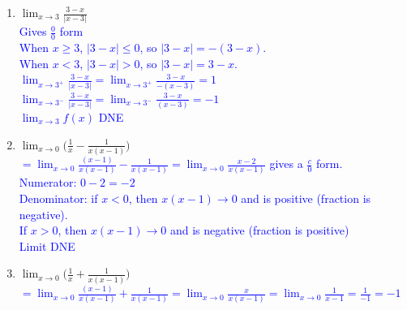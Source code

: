 \documentclass{ximera}
\begin{document}
\begin{exercise}
\begin{enumerate}
    \item $\displaystyle \lim_{x\rightarrow 3} \frac{3-x}{|x-3|}$\\
    \textcolor{blue}{ Gives $\frac{0}{0}$ form\\
    When $x\geq 3$, $|3-x|\leq 0$, so $|3-x|=-(3-x)$.\\
    When $x<3$, $|3-x|>0$, so $|3-x|=3-x$.\\
    $\lim_{x\rightarrow 3^+}\frac{3-x}{|x-3|}=\lim_{x\rightarrow 3^+}\frac{3-x}{-(x-3)}=1$\\
     $\lim_{x\rightarrow 3^-}\frac{3-x}{|x-3|}=\lim_{x\rightarrow 3^-}\frac{3-x}{(x-3)}=-1$\\
    $\lim_{x\rightarrow 3}f(x)$ DNE}

    \item $\displaystyle \lim_{x\rightarrow 0} \bigg( \frac{1}{x}-\frac{1}{x(x-1)}\bigg)$\\
    \textcolor{blue}{ $=\displaystyle\lim_{x\rightarrow 0} \frac{(x-1)}{x(x-1)}-\frac{1}{x(x-1)}=\lim_{x\rightarrow 0} \frac{x-2}{x(x-1)}$ gives a $\frac{c}{0}$ form.\\
    Numerator: $0-2=-2$\\
    Denominator: if $x<0$, then $x(x-1)\rightarrow 0$ and is positive (fraction is negative).\\
    If $x>0$, then $x(x-1)\rightarrow 0$ and is negative (fraction is positive)\\
    Limit DNE}

     \item $\displaystyle \lim_{x\rightarrow 0} \bigg( \frac{1}{x}+\frac{1}{x(x-1)}\bigg)$\\
     \textcolor{blue}{ $=\displaystyle\lim_{x\rightarrow 0} \frac{(x-1)}{x(x-1)}+\frac{1}{x(x-1)}=\lim_{x\rightarrow 0} \frac{x}{x(x-1)}=\lim_{x\rightarrow0} \frac{1}{x-1}=\frac{1}{-1}=-1$}

  \end{enumerate}
\end{exercise} 
\end{document}
